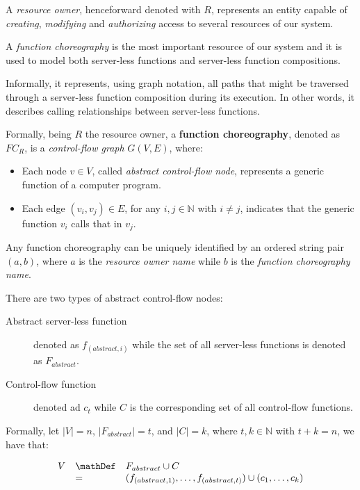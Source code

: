 A \textit{resource owner}, henceforward denoted with $R$, represents an entity capable of \textit{creating}, \textit{modifying} and \textit{authorizing} access to several resources of our system.

A \textit{function choreography} is the most important resource of our system and it is used to model both server-less functions and server-less function compositions.

Informally, it represents, using graph notation, all paths that might be traversed through a server-less function composition during its execution. In other words, it describes calling relationships between server-less functions.

Formally, being $R$ the resource owner, a \textbf{function choreography}, denoted as $FC_R$, is a \textit{control-flow graph} $G(V,E)$, where:

\begin{itemize}
	\item Each node $v \in V$, called \textit{abstract control-flow node}, represents a generic function of a computer program.
	\item Each edge $(v_i, v_j) \in E$, for any $i,j \in \mathbb{N}$ with $i \neq j$, indicates that the generic function $v_i$ calls that in $v_j$.
\end{itemize} 

Any function choreography can be  uniquely identified by an ordered string pair $(a, b)$, where $a$ is the \textit{resource owner name} while $b$ is the \textit{function choreography name}.

There are two types of abstract control-flow nodes:

\begin{description}
	\item[Abstract server-less function] denoted as $f_{(abstract, i)}$ while the set of all server-less functions is denoted as $F_{abstract}$.
	\item[Control-flow function] denoted ad $c_t$ while $C$ is the corresponding set of all control-flow functions.
\end{description}

Formally, let $|V| = n$, $|F_{abstract}| = t$, and $|C| = k$, where $t,k \in \mathbb{N}$ with $t + k = n$, we have that:

\begin{equation}
	\begin{array}{lll}
		
		V & \mathDef & F_{abstract} \cup C \\
		& = & (f_{(abstract, 1)}, \ldots, f_{(abstract, t)}) \cup (c_1, \ldots, c_k) \\
	\end{array}
\end{equation}

